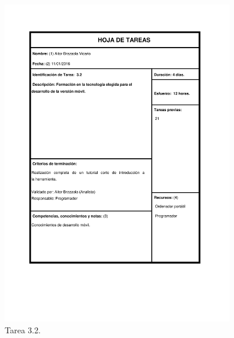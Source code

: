 \documentclass{DeustoFDP}
\begin{document}
\begin{figure}[H]
	\centering
	\includegraphics[width=0.9\textwidth]{fig/Tareas/32}
	\caption{Tarea 3.2.}
	\label{fig:t32}
\end{figure}
\end{document}
